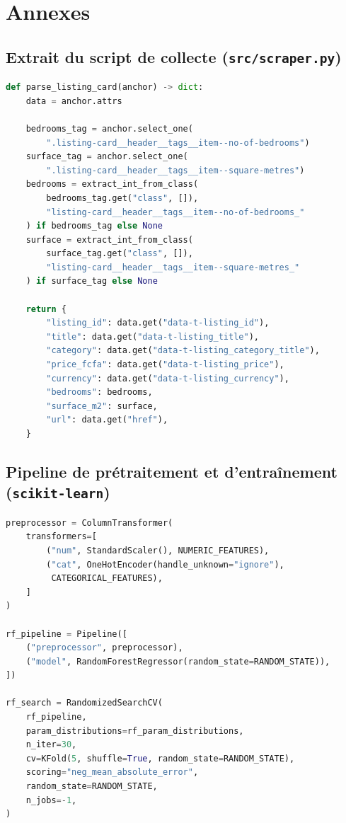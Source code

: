 \chapter{Annexes}

\section{Extrait du script de collecte (\texttt{src/scraper.py})}

\begin{lstlisting}[language=Python, caption={Extraction structurée d'une annonce à partir de ses attributs HTML \texttt{data-t-listing\_*}}]
def parse_listing_card(anchor) -> dict:
    data = anchor.attrs

    bedrooms_tag = anchor.select_one(
        ".listing-card__header__tags__item--no-of-bedrooms")
    surface_tag = anchor.select_one(
        ".listing-card__header__tags__item--square-metres")
    bedrooms = extract_int_from_class(
        bedrooms_tag.get("class", []),
        "listing-card__header__tags__item--no-of-bedrooms_"
    ) if bedrooms_tag else None
    surface = extract_int_from_class(
        surface_tag.get("class", []),
        "listing-card__header__tags__item--square-metres_"
    ) if surface_tag else None

    return {
        "listing_id": data.get("data-t-listing_id"),
        "title": data.get("data-t-listing_title"),
        "category": data.get("data-t-listing_category_title"),
        "price_fcfa": data.get("data-t-listing_price"),
        "currency": data.get("data-t-listing_currency"),
        "bedrooms": bedrooms,
        "surface_m2": surface,
        "url": data.get("href"),
    }
\end{lstlisting}

\section{Pipeline de prétraitement et d'entraînement (\texttt{scikit-learn})}

\begin{lstlisting}[language=Python, caption={Pipeline de prétraitement commun à tous les modèles}]
preprocessor = ColumnTransformer(
    transformers=[
        ("num", StandardScaler(), NUMERIC_FEATURES),
        ("cat", OneHotEncoder(handle_unknown="ignore"),
         CATEGORICAL_FEATURES),
    ]
)

rf_pipeline = Pipeline([
    ("preprocessor", preprocessor),
    ("model", RandomForestRegressor(random_state=RANDOM_STATE)),
])

rf_search = RandomizedSearchCV(
    rf_pipeline,
    param_distributions=rf_param_distributions,
    n_iter=30,
    cv=KFold(5, shuffle=True, random_state=RANDOM_STATE),
    scoring="neg_mean_absolute_error",
    random_state=RANDOM_STATE,
    n_jobs=-1,
)
\end{lstlisting}

